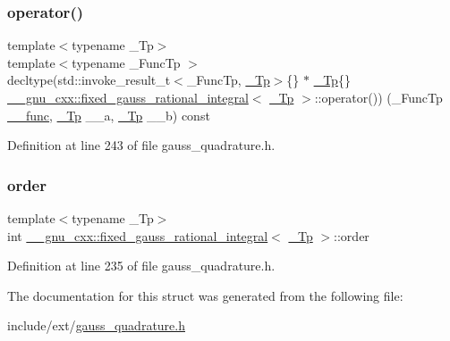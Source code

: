 \subsubsection{\texorpdfstring{operator()}{operator()}}
{\footnotesize\ttfamily template$<$typename \+\_\+\+Tp$>$ \\
template$<$typename \+\_\+\+Func\+Tp $>$ \\
decltype(std\+::invoke\+\_\+result\+\_\+t$<$\+\_\+\+Func\+Tp, \hyperlink{namespace____gnu__cxx_a3b19a9c800ca194374ef9172290f7d79}{\+\_\+\+Tp}$>$\{\} $\ast$ \hyperlink{namespace____gnu__cxx_a3b19a9c800ca194374ef9172290f7d79}{\+\_\+\+Tp}\{\} \hyperlink{struct____gnu__cxx_1_1fixed__gauss__rational__integral}{\+\_\+\+\_\+gnu\+\_\+cxx\+::fixed\+\_\+gauss\+\_\+rational\+\_\+integral}$<$ \hyperlink{namespace____gnu__cxx_a3b19a9c800ca194374ef9172290f7d79}{\+\_\+\+Tp} $>$\+::operator()) (\+\_\+\+Func\+Tp \hyperlink{namespace____gnu__cxx_af2b2f0c7a2ae72b922b1afefae5a65b2}{\+\_\+\+\_\+func}, \hyperlink{namespace____gnu__cxx_a3b19a9c800ca194374ef9172290f7d79}{\+\_\+\+Tp} \+\_\+\+\_\+a, \hyperlink{namespace____gnu__cxx_a3b19a9c800ca194374ef9172290f7d79}{\+\_\+\+Tp} \+\_\+\+\_\+b) const}



Definition at line 243 of file gauss\+\_\+quadrature.\+h.

\mbox{\label{struct____gnu__cxx_1_1fixed__gauss__rational__integral_a5998f7b5975013c67c95c2bacc279857}} 
\subsubsection{\texorpdfstring{order}{order}}
{\footnotesize\ttfamily template$<$typename \+\_\+\+Tp$>$ \\
int \hyperlink{struct____gnu__cxx_1_1fixed__gauss__rational__integral}{\+\_\+\+\_\+gnu\+\_\+cxx\+::fixed\+\_\+gauss\+\_\+rational\+\_\+integral}$<$ \hyperlink{namespace____gnu__cxx_a3b19a9c800ca194374ef9172290f7d79}{\+\_\+\+Tp} $>$\+::order}



Definition at line 235 of file gauss\+\_\+quadrature.\+h.



The documentation for this struct was generated from the following file\+:\begin{DoxyCompactItemize}
\item 
include/ext/\hyperlink{gauss__quadrature_8h}{gauss\+\_\+quadrature.\+h}\end{DoxyCompactItemize}
